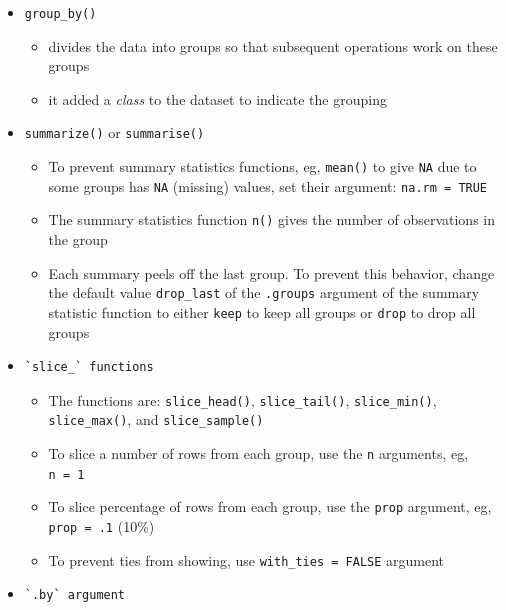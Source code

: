\documentclass[
  letterpaper,
  DIV=11,
  numbers=noendperiod]{scrreprt}
\providecommand{\tightlist}{%
  \setlength{\itemsep}{0pt}\setlength{\parskip}{0pt}}\usepackage{longtable,booktabs,array}
\begin{document}
\begin{itemize}
\item
  \texttt{group\_by()}

  \begin{itemize}
  \tightlist
  \item
    divides the data into groups so that subsequent operations work on
    these groups
  \item
    it added a \emph{class} to the dataset to indicate the grouping
  \end{itemize}
\item
  \texttt{summarize()} or \texttt{summarise()}

  \begin{itemize}
  \tightlist
  \item
    To prevent summary statistics functions, eg, \texttt{mean()} to give
    \texttt{NA} due to some groups has \texttt{NA} (missing) values, set
    their argument: \texttt{na.rm\ =\ TRUE}
  \item
    The summary statistics function \texttt{n()} gives the number of
    observations in the group
  \item
    Each summary peels off the last group. To prevent this behavior,
    change the default value \texttt{drop\_last} of the \texttt{.groups}
    argument of the summary statistic function to either \texttt{keep}
    to keep all groups or \texttt{drop} to drop all groups
  \end{itemize}
\item
\begin{verbatim}
`slice_` functions
\end{verbatim}

  \begin{itemize}
  \tightlist
  \item
    The functions are: \texttt{slice\_head()}, \texttt{slice\_tail()},
    \texttt{slice\_min()}, \texttt{slice\_max()}, and
    \texttt{slice\_sample()}
  \item
    To slice a number of rows from each group, use the \texttt{n}
    arguments, eg, \texttt{n\ =\ 1}
  \item
    To slice percentage of rows from each group, use the \texttt{prop}
    argument, eg, \texttt{prop\ =\ .1} (10\%)
  \item
    To prevent ties from showing, use \texttt{with\_ties\ =\ FALSE}
    argument
  \end{itemize}
\item
\begin{verbatim}
`.by` argument
\end{verbatim}


\end{itemize}
\end{document}
